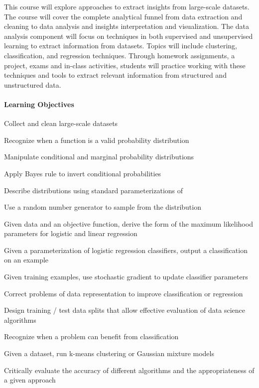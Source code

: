 \documentclass{article}
\begin{document}
This course will explore approaches to extract insights from large-scale datasets. The course will cover the complete analytical funnel from data extraction and cleaning to data analysis and insights interpretation and visualization. The data analysis component will focus on techniques in both supervised and unsupervised learning to extract information from datasets. Topics will include clustering, classification, and regression techniques.  Through homework assignments, a project, exams and in-class activities, students will practice working with these techniques and tools to extract relevant information from structured and unstructured data.


\paragraph{Learning Objectives}

\begin{itemize*}
\item Collect and clean large-scale datasets
\item Recognize when a function is a valid probability distribution
\item Manipulate conditional and marginal probability distributions
\item Apply Bayes rule to invert conditional probabilities
\item Describe distributions using standard parameterizations of
\item Use a random number generator to sample from the distribution
\item Given data and an objective function, derive the form of the maximum likelihood parameters for logistic and linear regression
\item Given a parameterization of logistic regression classifiers, output a classification on an example
\item Given training examples, use stochastic gradient to update classifier parameters
\item Correct problems of data representation to improve classification or regression
\item Design training / test data splits that allow effective evaluation of data science algorithms
\item Recognize when a problem can benefit from classification
\item Given a dataset, run k-means clustering or Gaussian mixture models
\item Critically evaluate the accuracy of different algorithms and the appropriateness of a given approach
  \end{itemize*}
\end{document}
